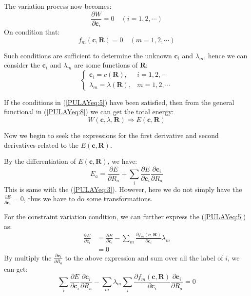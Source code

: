The variation process now becomes:
\begin{equation}\label{PULAYeq:5}
  \frac{\partial W}{\partial \bm{c}_{i}} = 0 \quad (i=1,2, \cdots)
\end{equation}
On condition that:
\begin{equation}\label{PULAYeq:15}
  f_{m}(\bm{c}, \bm{R}) =  0 \quad (m=1,2, \cdots)
\end{equation}

Such conditions are sufficient to determine the unknown $\bm{c}_{i}$ and
$\lambda_{m}$, hence we can consider the $\bm{c}_{i}$ and $\lambda_{m}$ are
some functions of $\bm{R}$:
\begin{equation}\label{}
  \left\{
    \begin{array}{ll}
      \bm{c}_{i} = c(\bm{R}),             & i=1,2,\cdots  \\
      \lambda_{m} = \lambda(\bm{R}), & m=1,2,\cdots
    \end{array}
  \right.
\end{equation}

If the conditions in (\ref{PULAYeq:5}) have been satisfied, then from
the general functional in (\ref{PULAYeq:8}) we can get the total
energy:
\begin{equation}\label{PULAYeq:4}
  W(\bm{c}, \lambda, \bm{R}) \Rightarrow E(\bm{c}, \bm{R})
\end{equation}

Now we begin to seek the expressions for the first derivative and
second derivatives related to the $E(\bm{c}, \bm{R})$.

By the differentiation of $E(\bm{c}, \bm{R})$, we have:
\begin{equation}\label{PULAYeq:6}
  E_{a} =\frac{\partial E}{\partial R_{a}} + \sum_{i}\frac{\partial
    E}{\partial \bm{c}_{i}}\frac{\partial \bm{c}_{i}}{\partial R_{a}}
\end{equation}
This is same with the (\ref{PULAYeq:3}). However, here we do not
simply have the $\frac{\partial E}{\partial \bm{c}_{i}} = 0$, thus we have
to do some transformations.

For the constraint variation condition, we can further express the
(\ref{PULAYeq:5}) as:
\begin{align}\label{}
  \frac{\partial W}{\partial \bm{c}_{i}} &= \frac{\partial E}{\partial
   \bm{c}_{i}} - \sum_{m}\frac{\partial f_{m}(\bm{c}, \bm{R})}{\partial
    \bm{c}_{i}}\lambda_{m} \nonumber \\
  &= 0
\end{align}
By multiply the $\frac{\partial \bm{c}_{i}}{\partial R_{a}}$ to the above
expression and sum over all the label of $i$, we can get:
\begin{equation}\label{PULAYeq:17}
  \sum_{i}\frac{\partial E}{\partial \bm{c}_{i}}\frac{\partial
    \bm{c}_{i}}{\partial R_{a}} - \sum_{m}\lambda_{m}\sum_{i}\frac{\partial
    f_{m}(\bm{c}, \bm{R})}{\partial \bm{c}_{i}}\frac{\partial
\bm{c}_{i}}{\partial R_{a}} = 0
\end{equation}

